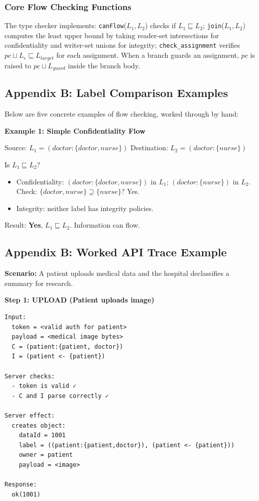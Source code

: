 \subsubsection*{Core Flow Checking Functions}

The type checker implements: \texttt{canFlow}($L_1, L_2$) checks if $L_1 \sqsubseteq L_2$; \texttt{join}($L_1, L_2$) computes the least upper bound by taking reader-set intersections for confidentiality and writer-set unions for integrity; \texttt{check\_assignment} verifies $pc \sqcup L_e \sqsubseteq L_{target}$ for each assignment. When a branch guards an assignment, $pc$ is raised to $pc \sqcup L_{guard}$ inside the branch body.

\subsection{Appendix B: Label Comparison Examples}

Below are five concrete examples of flow checking, worked through by hand:

\textbf{Example 1: Simple Confidentiality Flow}

Source: $L_1 = (doctor:\{doctor,nurse\})$
Destination: $L_2 = (doctor:\{nurse\})$

Is $L_1 \sqsubseteq L_2$?

\begin{itemize}
    \item Confidentiality: $(doctor:\{doctor,nurse\})$ in $L_1$; $(doctor:\{nurse\})$ in $L_2$. Check: $\{doctor, nurse\} \supseteq \{nurse\}$? Yes.
    \item Integrity: neither label has integrity policies.
\end{itemize}

Result: \textbf{Yes}, $L_1 \sqsubseteq L_2$. Information can flow.

\subsection{Appendix B: Worked API Trace Example}

\textbf{Scenario:} A patient uploads medical data and the hospital declassifies a summary for research.

\textbf{Step 1: UPLOAD (Patient uploads image)}

\begin{verbatim}
Input:
  token = <valid auth for patient>
  payload = <medical image bytes>
  C = (patient:{patient, doctor})
  I = (patient <- {patient})

Server checks:
  - token is valid ✓
  - C and I parse correctly ✓
  
Server effect:
  creates object:
    dataId = 1001
    label = ((patient:{patient,doctor}), (patient <- {patient}))
    owner = patient
    payload = <image>
    
Response:
  ok(1001)
\end{verbatim}


